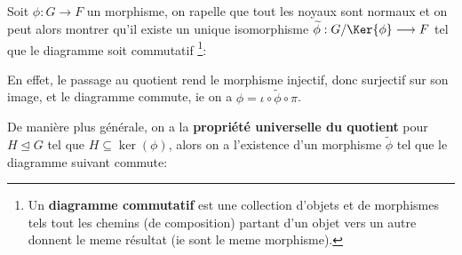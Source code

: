 \subsection*{}
Soit \(\phi : G \longrightarrow F\) un morphisme, on rapelle que tout les noyaux sont normaux et on peut alors montrer qu'il existe un unique isomorphisme \(\widetilde{\phi} : G/\Ker{\phi} \longrightarrow F\) tel que le diagramme soit commutatif \footnote[1]{Un \textbf{diagramme commutatif} est une collection d'objets et de morphismes tels tout les chemins (de composition) partant d'un objet vers un autre donnent le meme résultat (ie sont le meme morphisme).}:
\begin{center}
\end{center}
En effet, le passage au quotient rend le morphisme injectif, donc surjectif sur son image, et le diagramme commute, ie on a \( \phi = \iota \circ \widetilde{ \phi} \circ \pi \).\<

De manière plus générale, on a la \textbf{propriété universelle du quotient} pour \( H \unlhd G \) tel que \( H \subseteq \ker(\phi) \), alors on a l'existence d'un morphisme \( \widetilde{\phi} \) tel que le diagramme suivant commute:
\begin{center}
\end{center}
